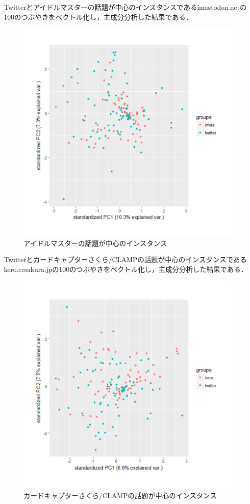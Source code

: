 Twitterとアイドルマスターの話題が中心のインスタンスであるimastodon.netの100のつぶやきをベクトル化し，主成分分析した結果である．
\begin{figure}[h]
\centering
\includegraphics[width=13cm,clip]{imas.pdf}
\caption{アイドルマスターの話題が中心のインスタンス}\label{imas}
\end{figure}
\newpage

Twitterとカードキャプターさくら/CLAMPの話題が中心のインスタンスであるkero.ccsakura.jpの100のつぶやきをベクトル化し，主成分分析した結果である．
\begin{figure}[h]
\centering
\includegraphics[width=13cm,clip]{kero.pdf}
\caption{カードキャプターさくら/CLAMPの話題が中心のインスタンス}\label{kero}
\end{figure}
\newpage

